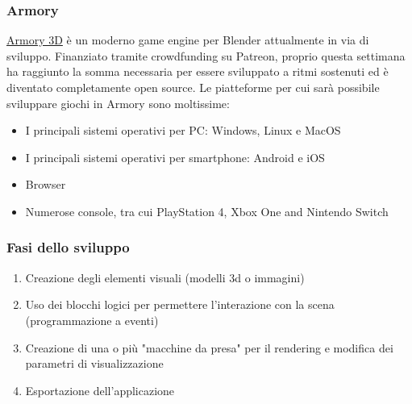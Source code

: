 \documentclass{beamer}
\begin{document}
		\begin{frame}
			\frametitle{Armory}
			\textcolor{BlenderOrange}{\href{http://armory3d.org/}{Armory 3D}} è un moderno game engine per Blender attualmente in via di sviluppo. Finanziato tramite crowdfunding su Patreon, proprio questa settimana ha raggiunto la somma necessaria per essere sviluppato a ritmi sostenuti ed è diventato completamente open source. Le piatteforme per cui sarà possibile sviluppare giochi in Armory sono moltissime:
			\begin{itemize}
				\item I principali sistemi operativi per PC: Windows, Linux e MacOS
				\item I principali sistemi operativi per smartphone: Android e iOS 
				\item Browser
				\item Numerose console, tra cui PlayStation 4, Xbox One and Nintendo Switch
			\end{itemize}
		\end{frame}
		\begin{frame}
			\frametitle{Fasi dello sviluppo}
			\begin{enumerate}
				\item Creazione degli elementi visuali (modelli 3d o immagini)
				\item Uso dei blocchi logici per permettere l'interazione con la scena (programmazione a eventi)
				\item Creazione di una o più "macchine da presa" per il rendering e modifica dei parametri di visualizzazione
				\item Esportazione dell'applicazione
			\end{enumerate}
		\end{frame}
	
\end{document}
